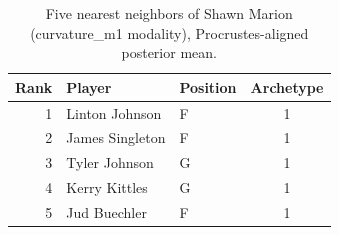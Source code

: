 \begin{table}[htbp]
  \centering\small
  \begin{tabular}{rllc}
    \toprule
    Rank & Player & Position & Archetype \\
    \midrule
    1 & Linton Johnson & F & 1 \\
    2 & James Singleton & F & 1 \\
    3 & Tyler Johnson & G & 1 \\
    4 & Kerry Kittles & G & 1 \\
    5 & Jud Buechler & F & 1 \\
    \bottomrule
  \end{tabular}
  \caption{Five nearest neighbors of Shawn Marion (curvature_m1 modality), Procrustes-aligned posterior mean.}
  \label{tab:Shawn_Marion_neighbors_curvature_m1}
\end{table}

